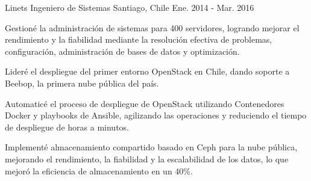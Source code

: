 \begin{cventries}
  \cventry
    {Linets}
    {Ingeniero de Sistemas}
    {Santiago, Chile}
    {Ene. 2014 - Mar. 2016}
    {
      \begin{cvitems}
        \item{Gestioné la administración de sistemas para 400 servidores, logrando mejorar el rendimiento y la fiabilidad mediante la resolución efectiva de problemas, configuración, administración de bases de datos y optimización.}
        \item{Lideré el despliegue del primer entorno OpenStack en Chile, dando soporte a Beebop, la primera nube pública del país.}
        \item{Automaticé el proceso de despliegue de OpenStack utilizando Contenedores Docker y playbooks de Ansible, agilizando las operaciones y reduciendo el tiempo de despliegue de horas a minutos.}
        \item{Implementé almacenamiento compartido basado en Ceph para la nube pública, mejorando el rendimiento, la fiabilidad y la escalabilidad de los datos, lo que mejoró la eficiencia de almacenamiento en un 40\%.}
      \end{cvitems}
    }

\end{cventries}